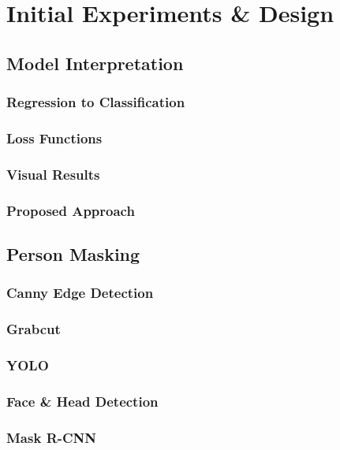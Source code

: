 \chapter{Initial Experiments \& Design}
\label{chap:design}

\lipsum[1]




\section{Model Interpretation}
\label{sec:model-interpretration}

\subsection{Regression to Classification}
\label{subsec:gradcam-apply}

\subsection{Loss Functions}
\label{subsec:gradcam-loss}

\subsection{Visual Results}
\label{subsec:gradcam-results}

\subsection{Proposed Approach}
\label{subsec:proposed-approach}




\section{Person Masking}
\label{sec:masking}

\subsection{Canny Edge Detection}
\label{subsec:masking-canny}

\subsection{Grabcut}
\label{subsec:masking-grabcut}

\subsection{YOLO}
\label{subsec:masking-yolo}

\subsection{Face \& Head Detection}
\label{subsec:masking-facehead}

\subsection{Mask R-CNN}
\label{subsec:masking-maskrcnn}





